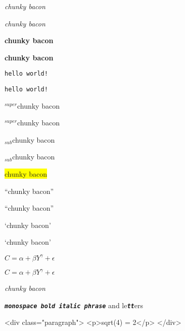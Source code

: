 
\emph{chunky bacon}

\emph{chunky bacon}

\textbf{chunky bacon}

\textbf{chunky bacon}

\texttt{hello world!}

\texttt{hello world!}

${}^{super}$chunky bacon

${}^{super}$chunky bacon

${}_{sub}$chunky bacon

${}_{sub}$chunky bacon

\colorbox{yellow}{ chunky bacon}

``chunky bacon''

``chunky bacon''

`chunky bacon'

`chunky bacon'

$C = \alpha + \beta Y^{\gamma} + \epsilon$

$C = \alpha + \beta Y^{\gamma} + \epsilon$

\emph{chunky bacon}

\texttt{\textbf{\emph{monospace bold italic phrase}}} and le\texttt{\textbf{\emph{tt}}}ers

<div class="paragraph">
<p>sqrt(4) = 2</p>
</div>
